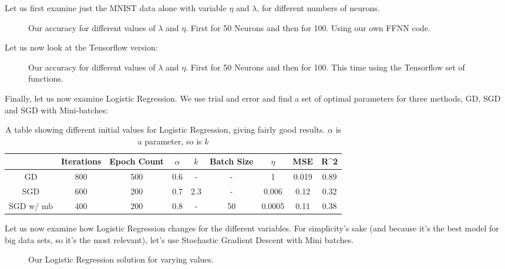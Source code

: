 \documentclass{article}
\begin{document}
Let us first examine just the MNIST data alone with variable $\eta$ and $\lambda$, for different numbers of neurons.
\begin{figure}[ht!]
\centering
{}
\caption{Our accuracy for different values of $\lambda$ and $\eta$. First for 50 Neurons and then for 100. Using our own FFNN code.}
\end{figure}
\newline
Let us now look at the Tensorflow version:
\begin{figure}[ht!]
\centering
{}
\caption{Our accuracy for different values of $\lambda$ and $\eta$. First for 50 Neurons and then for 100. This time using the Tensorflow set of functions.}
\end{figure} \newpage
Finally, let us now examine Logistic Regression.
We use trial and error and find a set of optimal parameters for three methods, GD, SGD and SGD with Mini-batches:
\begin{table}[ht!]
\centering
 \begin{tabular}{||c c c c c c c c c||}
 \hline

 & Iterations & Epoch Count & $\alpha$ & $k$& Batch Size&$\eta$& MSE& R^2 \\ [0.5ex] 
 \hline
 \hline
 GD& 800& 500& 0.6& -& -& 1& 0.019& 0.89  \\
 \hline
 SGD &  600& 200& 0.7& 2.3& -& 0.006& 0.12& 0.32  \\ 
 \hline
 SGD w/ mb &  400& 200& 0.8& -& 50& 0.0005& 0.11& 0.38  \\ 
 \hline
 \hline
\end{tabular}
\caption{A table showing different initial values for Logistic Regression, giving fairly good results. $\alpha$ is a parameter, so is $k$}
\label{tab1}
\end{table}
Let us now examine how Logistic Regression changes for the different variables. For simplicity's sake (and because it's the best model for big data sets, so it's the most relevant), let's use Stochastic Gradient Descent with Mini batches.
\begin{figure}[ht!]
\centering
{}
\newline
{}

\caption{Our Logistic Regression solution for varying values.}
\end{figure}
\end{document}
